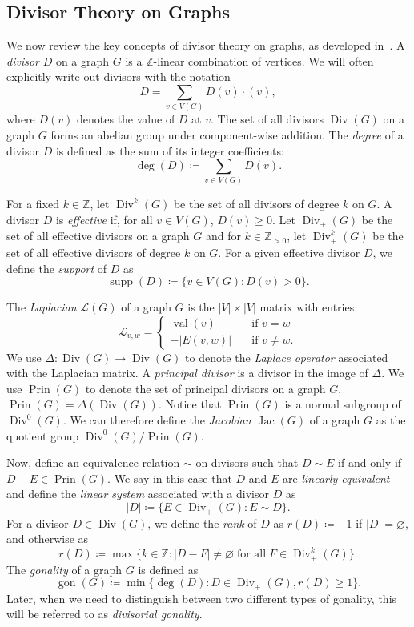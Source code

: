 \documentclass[10pt]{amsart}
\DeclareMathOperator{\gon}{gon}
\DeclareMathOperator{\val}{val}
\DeclareMathOperator{\Div}{Div}
\DeclareMathOperator{\supp}{supp}
\DeclareMathOperator{\Prin}{Prin}
\DeclareMathOperator{\Jac}{Jac}
\begin{document}
\subsection{Divisor Theory on Graphs}

We now review the key concepts of divisor theory on graphs, as developed in~\cite{baker}. A \emph{divisor} $D$ on a graph $G$ is a $\mathbb{Z}$-linear combination of vertices. We will often explicitly write out divisors with the notation
\[
D = \sum_{v \in V(G)} D(v) \cdot (v),
\]
where $D(v)$ denotes the value of $D$ at $v$.
The set of all divisors $\Div (G)$ on a graph $G$ forms an abelian group under component-wise addition. The \emph{degree} of a divisor $D$ is defined as the sum of its integer coefficients:
\[
\deg (D) \coloneqq \sum_{v \in V(G)} D(v).
\]

For a fixed $k \in \mathbb{Z}$, let $\Div ^k(G)$ be the set of all divisors of degree $k$ on $G$. A divisor $D$ is \emph{effective} if, for all $v \in V(G)$, $D(v) \geq 0$. Let $\Div _+(G)$ be the set of all effective divisors on a graph $G$ and for $k \in \mathbb{Z}_{>0}$, let $\Div _+^k(G)$ be the set of all effective divisors of degree $k$ on $G$. For a given effective divisor $D$, we define the \emph{support} of $D$ as
\[
\supp (D) \coloneqq \{ v \in V(G) : D(v) > 0 \}.
\]

The \emph{Laplacian} $\mathcal{L}(G)$ of a graph $G$ is the $|V|\times |V|$ matrix with entries
\[
\mathcal{L}_{v,w} = 
\begin{cases}
\val (v) \quad &\text{if $v = w$} \\
-| E(v, w) | \quad &\text{if $v \neq w$}.
\end{cases}
\]
We use $\Delta : \Div (G) \to \Div (G)$ to denote the \emph{Laplace operator} associated with the Laplacian matrix. A \emph{principal divisor} is a divisor in the image of $\Delta$. We use $\Prin (G)$ to denote the set of principal divisors on a graph $G$, \ie $\Prin (G) = \Delta(\Div (G))$. Notice that $\Prin (G)$ is a normal subgroup of $\Div ^0(G)$. We can therefore define the \emph{Jacobian} $\Jac (G)$ of a graph $G$ as the quotient group $\Div ^0(G) / \Prin (G)$.

Now, define an equivalence relation $\sim$ on divisors such that $D \sim E$ if and only if $D - E \in \Prin (G)$. We say in this case that $D$ and $E$ are \emph{linearly equivalent} and define the \emph{linear system} associated with a divisor $D$ as
\[
|D| \coloneqq \{ E \in \Div _+(G) : E \sim D \}.
\]
For a divisor $D \in \Div (G)$, we define the \emph{rank} of $D$ as $r(D) \coloneqq -1$ if $|D| = \varnothing$, and otherwise as
\[
r(D) \coloneqq \max \{ k \in \mathbb{Z} : |D - F| \neq \varnothing \; \text{for all} \; F \in \Div _+^k(G) \}.
\]
The \emph{gonality} of a graph $G$ is defined as
\[
\gon (G) \coloneqq \min \{ \deg (D) : D \in \Div _+(G), r(D) \geq 1 \}.
\] Later, when we need to distinguish between two different types of gonality, this will be referred to as \emph{divisorial gonality}.
\end{document}
